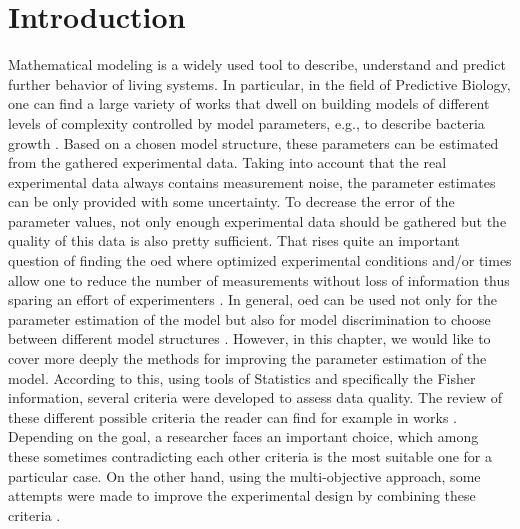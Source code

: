 \documentclass[10pt,A4paper]{article}
\begin{document}
\section*{Introduction}
%
Mathematical modeling is a widely used tool to describe, understand and predict further behavior of living systems.
In particular, in the field of Predictive Biology, one can find a large variety of works that dwell on building models of different levels of complexity controlled by model parameters, e.g., to describe bacteria growth \cite{bernaertsConceptsToolsPredictive2004}.
Based on a chosen model structure, these parameters can be estimated from the gathered experimental data.
Taking into account that the real experimental data always contains measurement noise, the parameter estimates can be only provided with some uncertainty. 
To decrease the error of the parameter values, not only enough experimental data should be gathered but the quality of this data is also pretty sufficient.
That rises quite an important question of finding the \ac{oed} where optimized experimental conditions and/or times allow one to reduce the number of measurements without loss of information thus sparing an effort of experimenters \cite{derlindenImpactExperimentDesign2013, balsa-cantoe.bangaj.r.COMPUTINGOPTIMALDYNAMIC2008}. 
In general, \ac{oed} can be used not only for the parameter estimation of the model but also for model discrimination to choose between different model structures \cite{kreutzSystemsBiology2009, stamatiOptimalExperimentalDesign2016}.
However, in this chapter, we would like to cover more deeply the methods for improving the parameter estimation of the model.
According to this, using tools of Statistics and specifically the Fisher information, several criteria were developed to assess data quality. 
The review of these different possible criteria the reader can find for example in works \cite{atkinsonDevelopmentsDesignExperiments1982, franceschiniModelbasedDesignExperiments2008}.
Depending on the goal, a researcher faces an important choice, which among these sometimes contradicting each other criteria is the most suitable one for a particular case.
On the other hand, using the multi-objective approach, some attempts were made to improve the experimental design by combining these criteria \cite{telenOptimalExperimentDesign2012, logistRobustMultiobjectiveOptimal2011}.
\end{document}
